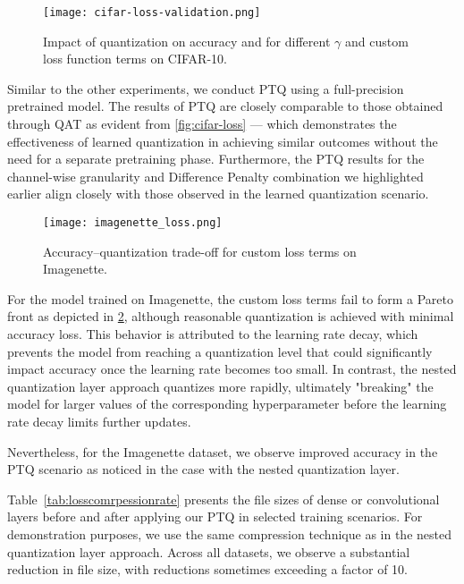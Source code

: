 \begin{figure}[t!]
  \centering
  \texttt{[image: cifar-loss-validation.png]}
  \caption{Impact of quantization on accuracy and for different \( \gamma \) and custom loss function terms on CIFAR-10.}
  \label{fig:cifar-loss-validation}
\end{figure}

Similar to the other experiments, we conduct PTQ using a full-precision pretrained model. 
The results of PTQ are closely comparable to those obtained through QAT as evident from \cref{fig:cifar-loss}
— which demonstrates the effectiveness of learned quantization in achieving similar outcomes 
without the need for a separate pretraining phase.
Furthermore, the PTQ results for the channel-wise granularity and Difference Penalty combination we highlighted earlier
align closely with those observed in the learned quantization scenario.

\begin{figure}[t!]
  \centering
  \texttt{[image: imagenette\_loss.png]}
  \caption{Accuracy–quantization trade-off for custom loss terms on Imagenette.}
  \label{fig:imagenette-loss}
\end{figure}

For the model trained on Imagenette, 
the custom loss terms fail to form a Pareto front as depicted in \cref{fig:imagenette-loss}, 
although reasonable quantization is achieved with minimal accuracy loss. 
This behavior is attributed to the learning rate decay, 
which prevents the model from reaching a quantization level that could significantly 
impact accuracy once the learning rate becomes too small. In contrast, 
the nested quantization layer approach quantizes more rapidly, ultimately 
"breaking" the model for larger values of the corresponding 
hyperparameter before the learning rate decay limits further updates.

Nevertheless, for the Imagenette dataset, we observe improved accuracy in the PTQ scenario
as noticed in the case with the nested quantization layer. 

Table~\ref{tab:losscomrpessionrate} presents the file sizes of dense or convolutional layers before and after applying our PTQ in selected training scenarios. 
For demonstration purposes, we use the same compression technique as in the nested quantization layer approach.
Across all datasets, we observe a substantial reduction in file size, with reductions sometimes exceeding a factor of 10. 


